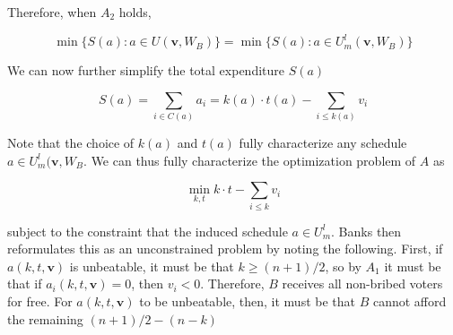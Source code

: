 \documentclass[12pt,a4paper]{article}
\begin{document}
Therefore, when $A_2$ holds,

$$\min\{S(a): a \in U(\mathbf{v}, W_B)\} = \min\{S(a): a \in U^l_m(\mathbf{v}, W_B)\}$$

We can now further simplify the total expenditure $S(a)$

\begin{equation*}
    S(a) = \sum_{i \in C(a)}a_i = k(a) \cdot t(a) - \sum_{i \leq k(a)}v_i
\end{equation*}

Note that the choice of $k(a)$ and $t(a)$ fully characterize any schedule $a \in U_m^l(\mathbf{v}, W_B$. We can thus fully characterize the optimization problem of $A$ as

\begin{equation*}
    \min_{k,t} k \cdot t- \sum_{i \leq k} v_i
\end{equation*}

subject to the constraint that the induced schedule $a \in U_m^l$. Banks then reformulates this as an unconstrained problem by noting the following. First, if $a(k, t, \mathbf{v})$ is unbeatable, it must be that $k \geq (n + 1)/2$, so by $A_1$ it must be that if $a_i(k, t, \mathbf{v}) = 0$, then $v_i < 0$. Therefore, $B$ receives all non-bribed voters for free. For $a(k, t, \mathbf{v})$ to be unbeatable, then, it must be that $B$ cannot afford the remaining $(n + 1)/2 - (n - k)$ 
\end{document}
